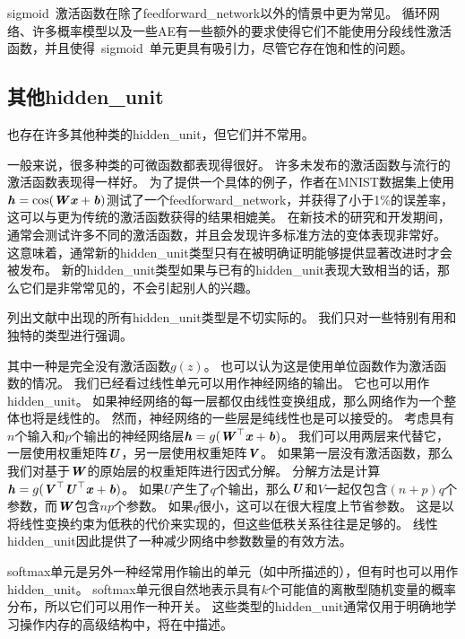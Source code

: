 
\gls{sigmoid}~激活函数在除了\gls{feedforward_network}以外的情景中更为常见。
循环网络、许多概率模型以及一些\gls{AE}有一些额外的要求使得它们不能使用分段线性激活函数，并且使得~\gls{sigmoid}~单元更具有吸引力，尽管它存在饱和性的问题。

\subsection{其他\gls{hidden_unit}}
\label{sec:other_hidden_units}

也存在许多其他种类的\gls{hidden_unit}，但它们并不常用。

一般来说，很多种类的可微函数都表现得很好。
许多未发布的激活函数与流行的激活函数表现得一样好。
为了提供一个具体的例子，作者在MNIST数据集上使用$\boldsymbol{\mathit{h}}=\cos(\boldsymbol{\mathit{W}}\boldsymbol{\mathit{x}}+\boldsymbol{\mathit{b}})$测试了一个\gls{feedforward_network}，并获得了小于1\%的误差率，这可以与更为传统的激活函数获得的结果相媲美。
在新技术的研究和开发期间，通常会测试许多不同的激活函数，并且会发现许多标准方法的变体表现非常好。
这意味着，通常新的\gls{hidden_unit}类型只有在被明确证明能够提供显著改进时才会被发布。
新的\gls{hidden_unit}类型如果与已有的\gls{hidden_unit}表现大致相当的话，那么它们是非常常见的，不会引起别人的兴趣。

列出文献中出现的所有\gls{hidden_unit}类型是不切实际的。
我们只对一些特别有用和独特的类型进行强调。

其中一种是完全没有激活函数$g(z)$。
也可以认为这是使用单位函数作为激活函数的情况。
我们已经看过线性单元可以用作神经网络的输出。
它也可以用作\gls{hidden_unit}。
如果神经网络的每一层都仅由线性变换组成，那么网络作为一个整体也将是线性的。
然而，神经网络的一些层是纯线性也是可以接受的。
考虑具有$n$个输入和$p$个输出的神经网络层$\boldsymbol{\mathit{h}}=g(\boldsymbol{\mathit{W}}^\top \boldsymbol{\mathit{x}}+\boldsymbol{\mathit{b}})$。
我们可以用两层来代替它，一层使用权重矩阵$\boldsymbol{\mathit{U}}$，另一层使用权重矩阵$\boldsymbol{\mathit{V}}$。
如果第一层没有激活函数，那么我们对基于$\boldsymbol{\mathit{W}}$的原始层的权重矩阵进行因式分解。
分解方法是计算$\boldsymbol{\mathit{h}}=g(\boldsymbol{\mathit{V}}^\top \boldsymbol{\mathit{U}}^\top \boldsymbol{\mathit{x}}+\boldsymbol{\mathit{b}})$。
如果$U$产生了$q$个输出，那么$\boldsymbol{\mathit{U}}$和$V$一起仅包含$(n+p)q$个参数，而$\boldsymbol{\mathit{W}}$包含$np$个参数。
如果$q$很小，这可以在很大程度上节省参数。
这是以将线性变换约束为低秩的代价来实现的，但这些低秩关系往往是足够的。
线性\gls{hidden_unit}因此提供了一种减少网络中参数数量的有效方法。



softmax单元是另外一种经常用作输出的单元（如中所描述的），但有时也可以用作\gls{hidden_unit}。
softmax单元很自然地表示具有$k$个可能值的离散型随机变量的概率分布，所以它们可以用作一种开关。
这些类型的\gls{hidden_unit}通常仅用于明确地学习操作内存的高级结构中，将在中描述。

